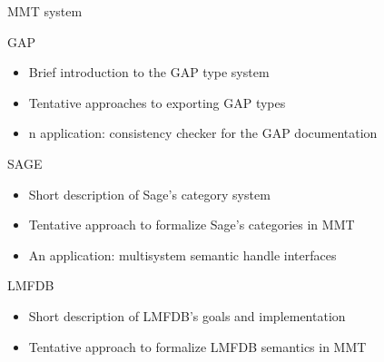 \documentclass{llncs}
\begin{document}
\begin{description}
\item{MMT system}
\item{GAP} 
\begin{itemize}
\item Brief introduction to the GAP type system 
\item Tentative approaches to exporting GAP types 
\item n application: consistency checker for the GAP documentation
\end{itemize}
\item{SAGE} 
\begin{itemize}
\item Short description of Sage's category system 
\item Tentative approach to formalize Sage's categories in MMT 
\item An application: multisystem semantic handle interfaces
\end{itemize}
\item{LMFDB}
\begin{itemize}
\item Short description of LMFDB's goals and implementation 
\item Tentative approach to formalize LMFDB semantics in MMT
\end{itemize}
\end{description}









\printbibliography
\end{document}
